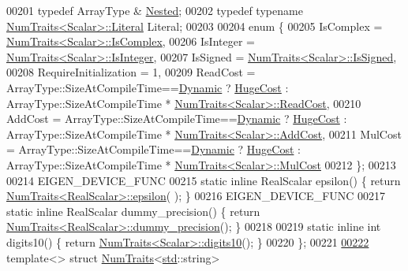 \begin{DoxyCode}
00201   \textcolor{keyword}{typedef} ArrayType & \hyperlink{group___core___module_class_eigen_1_1_array}{Nested};
00202   \textcolor{keyword}{typedef} \textcolor{keyword}{typename} \hyperlink{group___core___module_struct_eigen_1_1_num_traits}{NumTraits<Scalar>::Literal} Literal;
00203 
00204   \textcolor{keyword}{enum} \{
00205     IsComplex = \hyperlink{group___core___module_struct_eigen_1_1_num_traits}{NumTraits<Scalar>::IsComplex},
00206     IsInteger = \hyperlink{group___core___module_struct_eigen_1_1_num_traits}{NumTraits<Scalar>::IsInteger},
00207     IsSigned  = \hyperlink{group___core___module_struct_eigen_1_1_num_traits}{NumTraits<Scalar>::IsSigned},
00208     RequireInitialization = 1,
00209     ReadCost = ArrayType::SizeAtCompileTime==\hyperlink{namespace_eigen_ad81fa7195215a0ce30017dfac309f0b2}{Dynamic} ? \hyperlink{namespace_eigen_a3163430a1c13173faffde69016b48aaf}{HugeCost} : 
      ArrayType::SizeAtCompileTime * \hyperlink{group___core___module_struct_eigen_1_1_num_traits}{NumTraits<Scalar>::ReadCost},
00210     AddCost  = ArrayType::SizeAtCompileTime==\hyperlink{namespace_eigen_ad81fa7195215a0ce30017dfac309f0b2}{Dynamic} ? \hyperlink{namespace_eigen_a3163430a1c13173faffde69016b48aaf}{HugeCost} : 
      ArrayType::SizeAtCompileTime * \hyperlink{group___core___module_struct_eigen_1_1_num_traits}{NumTraits<Scalar>::AddCost},
00211     MulCost  = ArrayType::SizeAtCompileTime==\hyperlink{namespace_eigen_ad81fa7195215a0ce30017dfac309f0b2}{Dynamic} ? \hyperlink{namespace_eigen_a3163430a1c13173faffde69016b48aaf}{HugeCost} : 
      ArrayType::SizeAtCompileTime * \hyperlink{group___core___module_struct_eigen_1_1_num_traits}{NumTraits<Scalar>::MulCost}
00212   \};
00213 
00214   EIGEN\_DEVICE\_FUNC
00215   \textcolor{keyword}{static} \textcolor{keyword}{inline} RealScalar epsilon() \{ \textcolor{keywordflow}{return} \hyperlink{group___core___module_struct_eigen_1_1_num_traits}{NumTraits<RealScalar>::epsilon}(
      ); \}
00216   EIGEN\_DEVICE\_FUNC
00217   \textcolor{keyword}{static} \textcolor{keyword}{inline} RealScalar dummy\_precision() \{ \textcolor{keywordflow}{return} 
      \hyperlink{group___core___module_struct_eigen_1_1_num_traits}{NumTraits<RealScalar>::dummy\_precision}(); \}
00218 
00219   \textcolor{keyword}{static} \textcolor{keyword}{inline} \textcolor{keywordtype}{int} digits10() \{ \textcolor{keywordflow}{return} \hyperlink{group___core___module_struct_eigen_1_1_num_traits}{NumTraits<Scalar>::digits10}(); \}
00220 \};
00221 
\hyperlink{struct_eigen_1_1_num_traits_3_01std_1_1string_01_4}{00222} \textcolor{keyword}{template}<> \textcolor{keyword}{struct }\hyperlink{group___core___module_struct_eigen_1_1_num_traits}{NumTraits}<\hyperlink{namespacestd}{std}::string>

\end{DoxyCode}
